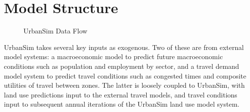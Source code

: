 \documentclass[fleqn]{article}
\begin{document}
\section{Model Structure}

\begin{figure}
\center {}
\caption{UrbanSim Data Flow} \label{urbansim-structure}
\end{figure}

UrbanSim takes several key inputs as exogenous.  Two of these are
from external model systems: a macroeconomic model to predict
future macroeconomic conditions such as population and employment
by sector, and a travel demand model system to predict travel
conditions such as congested times and composite utilities of
travel between zones.  The latter is loosely coupled to UrbanSim,
with land use predictions input to the external travel models, and
travel conditions input to subsequent annual iterations of the
UrbanSim land use model system.
\end{document}
